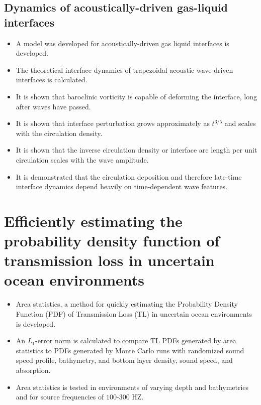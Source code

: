 \documentclass[12pt]{article}
\begin{document}
\subsection{Dynamics of acoustically-driven gas-liquid interfaces}
\begin{itemize}
\item A model was developed for acoustically-driven gas liquid interfaces is developed.
\item The theoretical interface dynamics of trapezoidal acoustic wave-driven interfaces is calculated.
\item It is shown that baroclinic vorticity is capable of deforming the interface, long after waves have passed.
\item It is shown that interface perturbation grows approximately as $t^{3/5}$ and scales with the circulation density.
\item It is shown that the inverse circulation density or interface arc length per unit circulation scales with the wave amplitude.
\item It is demonstrated that the circulation deposition and therefore late-time interface dynamics depend heavily on time-dependent wave features.
\end{itemize}


\section{Efficiently estimating the probability density function of transmission loss in uncertain ocean environments}
\begin{itemize}
\item Area statistics, a method for quickly estimating the Probability Density Function (PDF) of Transmission Loss (TL) in uncertain ocean environments is developed.
\item An $L_1$-error norm is calculated to compare TL PDFs generated by area statistics to PDFs generated by Monte Carlo runs with randomized sound speed profile, bathymetry, and bottom layer density, sound speed, and absorption.
\item Area statistics is tested in environments of varying depth and bathymetries and for source frequencies of $100$-$300$ HZ.
\end{itemize}
\end{document}
